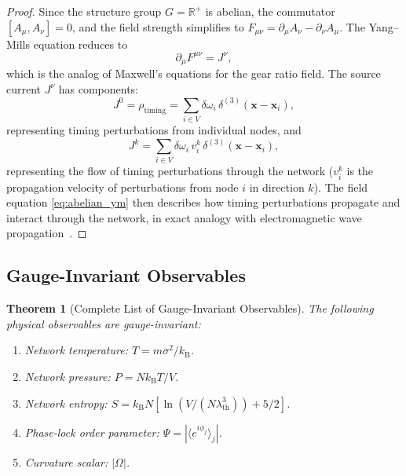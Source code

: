 \documentclass[11pt,twocolumn,a4paper]{article}
\newtheorem{theorem}{Theorem}[section]
\theoremstyle{definition}
\newcommand{\R}{\mathbb{R}}
\newcommand{\kB}{k_{\mathrm{B}}}
\begin{document}
\begin{proof}
Since the structure group $G = \R^+$ is abelian, the commutator $[A_\mu, A_\nu] = 0$,
and the field strength simplifies to $F_{\mu\nu} = \partial_\mu A_\nu - \partial_\nu A_\mu$.
The Yang--Mills equation reduces to
\begin{equation}\label{eq:abelian_ym}
  \partial_\mu F^{\mu\nu} = J^\nu,
\end{equation}
which is the analog of Maxwell's equations for the gear ratio field. The source current
$J^\nu$ has components:
\begin{equation}
  J^0 = \rho_{\mathrm{timing}} = \sum_{i \in V} \delta\omega_i \, \delta^{(3)}(\mathbf{x} - \mathbf{x}_i),
\end{equation}
representing timing perturbations from individual nodes, and
\begin{equation}
  J^k = \sum_{i \in V} \delta\omega_i \, v_i^k \, \delta^{(3)}(\mathbf{x} - \mathbf{x}_i),
\end{equation}
representing the flow of timing perturbations through the network ($v_i^k$ is the
propagation velocity of perturbations from node $i$ in direction $k$). The field equation
\eqref{eq:abelian_ym} then describes how timing perturbations propagate and interact
through the network, in exact analogy with electromagnetic wave
propagation~\cite{yangmills1954,nakahara2003}.
\end{proof}

\subsection{Gauge-Invariant Observables}\label{sec:gauge:observables}

\begin{theorem}[Complete List of Gauge-Invariant Observables]\label{thm:observables}
The following physical observables are gauge-invariant:
\begin{enumerate}[label=(\roman*)]
  \item Network temperature: $T = m\sigma^2/\kB$.
  \item Network pressure: $P = N\kB T/V$.
  \item Network entropy: $S = \kB N[\ln(V/(N\lambda_{\mathrm{th}}^3)) + 5/2]$.
  \item Phase-lock order parameter: $\Psi = |\langle e^{i\phi_j}\rangle_j|$.
  \item Curvature scalar: $|\Omega|$.
\end{enumerate}
\end{theorem}
\end{document}
